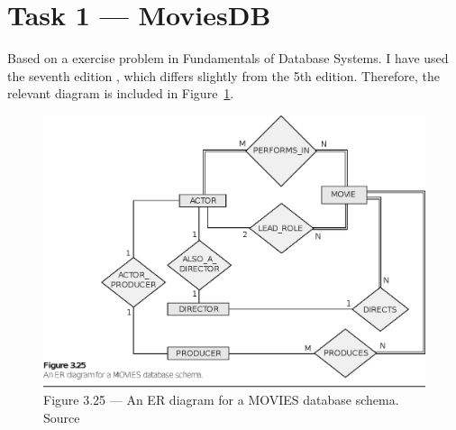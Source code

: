%
%
%


\section{Task 1 --- MoviesDB}
Based on a exercise problem in Fundamentals of Database Systems.
I have used the seventh edition \cite{2dv513:fds}, which differs slightly from
the 5th edition.
Therefore, the relevant diagram is included in Figure~\ref{fig:fds3.25}.


\begin{figure}[htbp]
  \centering
  \includegraphics[width=\linewidth]{include/fds_figure-3.25.eps}
  \caption{Figure 3.25 --- An ER diagram for a MOVIES database schema. Source\cite{2dv513:fds}}
  \label{fig:fds3.25}
\end{figure}



